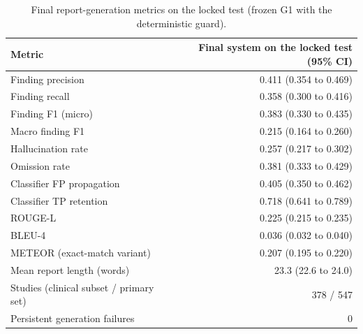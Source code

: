 \begin{table}[t]
\centering
\scriptsize
\begin{tabular}{lr}
\hline
Metric & Final system on the locked test (95\% CI) \\
\hline
Finding precision & 0.411 (0.354 to 0.469) \\
Finding recall & 0.358 (0.300 to 0.416) \\
Finding F1 (micro) & 0.383 (0.330 to 0.435) \\
Macro finding F1 & 0.215 (0.164 to 0.260) \\
Hallucination rate & 0.257 (0.217 to 0.302) \\
Omission rate & 0.381 (0.333 to 0.429) \\
Classifier FP propagation & 0.405 (0.350 to 0.462) \\
Classifier TP retention & 0.718 (0.641 to 0.789) \\
ROUGE-L & 0.225 (0.215 to 0.235) \\
BLEU-4 & 0.036 (0.032 to 0.040) \\
METEOR (exact-match variant) & 0.207 (0.195 to 0.220) \\
Mean report length (words) & 23.3 (22.6 to 24.0) \\
Studies (clinical subset / primary set) & 378 / 547 \\
Persistent generation failures & 0 \\
\hline
\end{tabular}
\caption{Final report-generation metrics on the locked test (frozen G1 with the deterministic guard).}
\label{tab:table5_final_report_generation_metrics}
\end{table}
